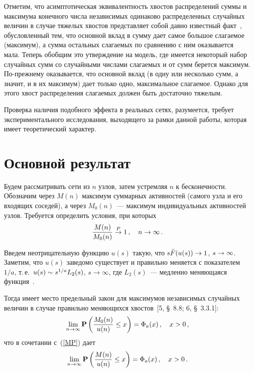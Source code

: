 \begin{multicols}{2}

    Отметим, что асимптотическая эквивалентность хвостов распределений
    суммы и максимума конечного числа независимых одинаково распределенных
    случайных величин в случае тяжелых хвостов
    представляет собой давно известный факт~\cite[\S\ 8.8]{Fel},
    обусловленный тем, что основной вклад в сумму дает самое большое
    слагаемое (максимум), а сумма остальных слагаемых по сравнению с
    ним оказывается мала. Теперь обобщим это утверждение
    на модель, где имеется
    некоторый набор случайных сумм со случайными числами слагаемых
    и от сумм берется максимум. По-преж\-не\-му оказывается, что основной
    вклад (в одну или несколько сумм, а значит, и в их максимум) дает только
    одно, максимальное слагаемое. Однако для этого хвост распределения
    слагаемых должен быть достаточно тяжелым.

    Проверка наличия подобного эффекта в реальных сетях, разумеется,
    требует экспериментального исследования, выходящего
    за рамки данной работы, которая имеет теоретический характер.
    
        \vspace*{-9pt}

    
    \section{Основной результат}
    
    \vspace*{-2pt}

    Будем рассматривать сети из $n$ узлов, затем устремляя $n$ к бесконечности.
    Обозначим через $M(n)$ максимум суммарных активностей (самого узла и его
    входящих соседей), а через $M_0(n)$~--- максимум индивидуальных активностей
    узлов. Требуется определить условия, при которых
    \begin{equation}
    \label{MP}
\displaystyle\frac{\displaystyle M(n)\mathstrut}{\displaystyle M_0(n)\mathstrut}\stackrel{P}{\to} 1\,,\quad n\to\infty\,.
    \end{equation}

    Введем неотрицательную функцию
    $u(s)$ такую, что $s{\bar F}(u(s))\hm\to 1$, $s\hm\to\infty$.
    Заметим, что $u(s)$ заведомо существует и правильно
    меняется с показателем $1/a$, т.\,е.\ $u(s)\hm\sim s^{1/a}L_2(s)$,
    $s\to\infty$, где $L_2(s)$~--- медленно меняющаяся функция~\cite[\S\ 1.5]{Sen}.

    Тогда имеет место предельный закон для максимумов независимых случайных
    величин в случае правильно меняющихся хвостов~[5, \S~8.8; 6, \S~3.3.1]:
    $$
    \lim\limits_{n\to\infty}{\bf P}\left(\displaystyle\frac{\displaystyle M_0(n)\mathstrut}{\displaystyle u(n)\mathstrut}\le x\right)=\Phi_a(x)\,,\quad x>0\,,
    $$
    что в сочетании с~(\ref{MP}) дает
    \begin{equation*}
    \lim\limits_{n\to\infty}{\bf P}\left(\displaystyle\frac{\displaystyle M(n)\mathstrut}{\displaystyle u(n)\mathstrut}\le x\right)=\Phi_a(x)\,,\quad x>0\,.
    \end{equation*}


\end{multicols}

